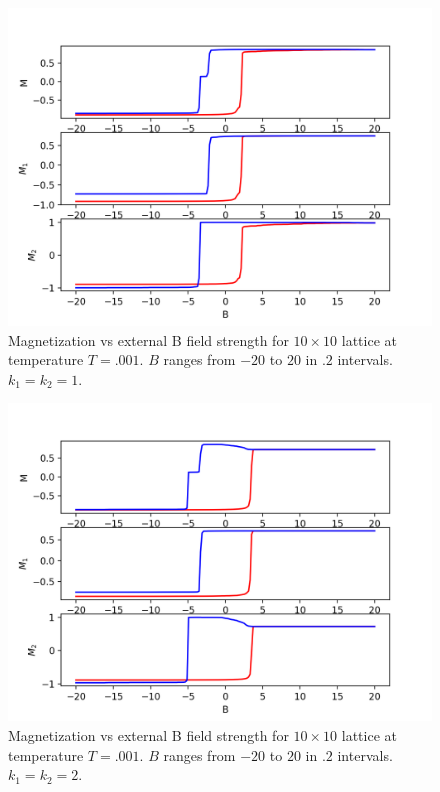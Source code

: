 \documentclass{article}
\begin{document}
\begin{figure}

  \includegraphics[width=\textwidth]{figures/magvb_b_20_k_1.png}

\caption{Magnetization vs external B field strength for $10 \times 10$ lattice at temperature $T = .001$. $B$ ranges from $-20$ to $20$ in $.2$ intervals. $k_{1} = k_{2} = 1$.
}
\end{figure}
\begin{figure}

  \includegraphics[width=\textwidth]{figures/magvb_b_20_k_2.png}

\caption{Magnetization vs external B field strength for $10 \times 10$ lattice at temperature $T = .001$. $B$ ranges from $-20$ to $20$ in $.2$ intervals. $k_{1} = k_{2} = 2$.
}
\end{figure}
\end{document}
